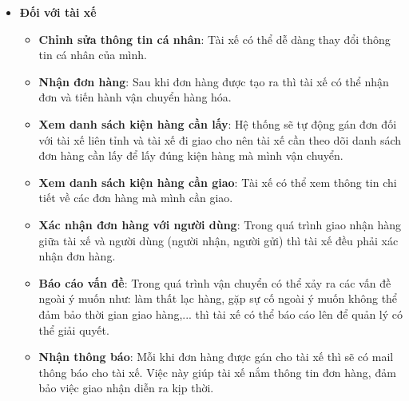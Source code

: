 \begin{itemize}
\begin{itemize}
				    \end{itemize}
				
			         
				\item \textbf{Đối với tài xế}
	                \begin{itemize}
	                    \item \textbf{Chỉnh sửa thông tin cá nhân}: Tài xế có thể dễ dàng thay đổi thông tin cá nhân của mình.
	                    \item \textbf{Nhận đơn hàng}: Sau khi đơn hàng được tạo ra thì tài xế có thể nhận đơn và tiến hành vận chuyển hàng hóa.
	                    \item \textbf{Xem danh sách kiện hàng cần lấy}: Hệ thống sẽ tự động gán đơn đối với tài xế liên tỉnh và tài xế đi giao cho nên tài xế cần theo dõi danh sách đơn hàng cần lấy để lấy đúng kiện hàng mà mình vận chuyển.
	                    \item \textbf{Xem danh sách kiện hàng cần giao}: Tài xế có thể xem thông tin chi tiết về các đơn hàng mà mình cần giao.
	                    \item \textbf{Xác nhận đơn hàng với người dùng}: Trong quá trình giao nhận hàng giữa tài xế và người dùng (người nhận, người gửi) thì tài xế đều phải xác nhận đơn hàng.
	                    \item \textbf{Báo cáo vấn đề}: Trong quá trình vận chuyển có thể xảy ra các vấn đề ngoài ý muốn như: làm thất lạc hàng, gặp sự cố ngoài ý muốn không thể đảm bảo thời gian giao hàng,... thì tài xế có thể báo cáo lên để quản lý có thể giải quyết.
	                    \item \textbf{Nhận thông báo}: Mỗi khi đơn hàng được gán cho tài xế thì sẽ có mail thông báo cho tài xế. Việc này giúp tài xế nắm thông tin đơn hàng, đảm bảo việc giao nhận diễn ra kịp thời.
	                \end{itemize}
	                

\end{itemize}
